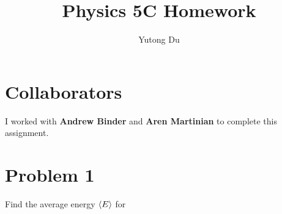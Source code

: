 \documentclass{article}
\title{Physics 5C Homework}
\author{Yutong Du}
\begin{document}
    \maketitle 

    \section*{Collaborators}

    I worked with \textbf{Andrew Binder} and \textbf{Aren Martinian} to complete this assignment.


    \section*{Problem 1}

    Find the average energy $\langle E \rangle$ for
\end{document}
